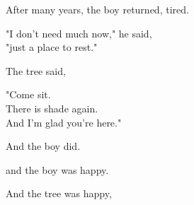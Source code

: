 \begin{center}
\begin{minipage}{0.85\textwidth}
\begin{multicols}{2}
{\large After many years, the boy returned, tired.\\
\vspace{0.5em}

"I don't need much now," he said,\\
"just a place to rest."}

{\large The tree said,\\
\vspace{0.5em}

"Come sit.\\
There is shade again.\\
And I'm glad you're here."}

{\large And the boy did.\\
\vspace{0.5em}

and the boy was happy.}

\vspace{1.5em}

{\large And the tree was happy,
}

\vspace{0.5em}
\end{multicols}
\end{minipage}
\end{center}
\vfill

